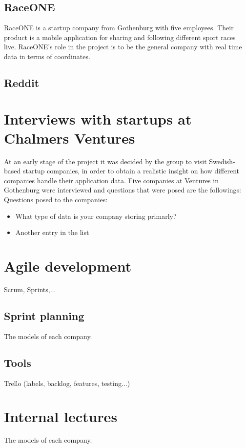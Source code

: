 \subsection{RaceONE}
RaceONE is a startup company from Gothenburg with five employees. Their product is a mobile application for sharing and following different sport races live.
RaceONE's role in the project is to be the general company with real time data in terms of coordinates.  
\subsection{Reddit}

\section{Interviews with startups at Chalmers Ventures}
At an early stage of the project it was decided by the group to visit Swedish-based startup companies, in order to obtain a realistic insight on how different companies handle their application data. Five companies at Ventures in Gothenburg were interviewed and questions that were posed are the followings:
\\[0.5cm]
Questions posed to the companies:

\begin{itemize}
\item What type of data is your company storing primarly? 
\item Another entry in the list
\end{itemize}

\section{Agile development}
Scrum, Sprints,...
\subsection{Sprint planning}
The models of each company.
\subsection{Tools}
Trello (labels, backlog, features, testing...)

\section{Internal lectures}
The models of each company.

